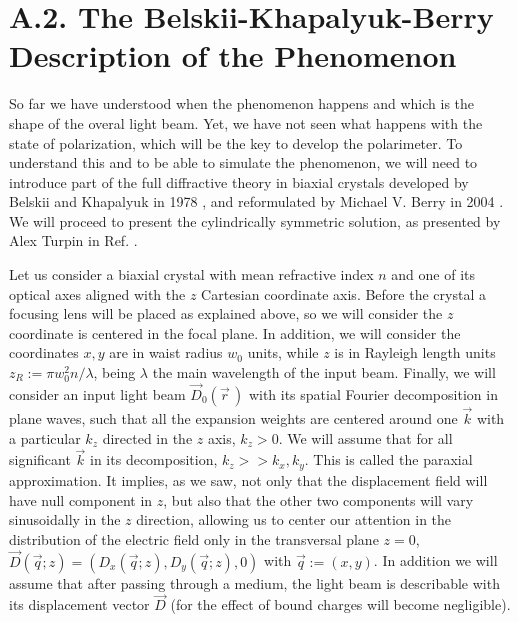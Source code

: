 \documentclass[11pt, a4paper, twoside]{article} %
\begin{document}
\section*{A.2. The Belskii-Khapalyuk-Berry Description of the Phenomenon }

So far we have understood when the phenomenon happens and which is the shape of the overal light beam. Yet, we have not seen what happens with the state of polarization, which will be the key to develop the polarimeter. To understand this and to be able to simulate the phenomenon, we will need to introduce part of the full diffractive theory in biaxial crystals developed by Belskii and Khapalyuk in 1978 \cite{BK1,BK2}, and reformulated by Michael V. Berry in 2004 \cite{Berry}. We will proceed to present the cylindrically symmetric solution, as presented by Alex Turpin in Ref. \cite{Turpin}.\vspace{-0.1cm}

Let us consider a biaxial crystal with mean refractive index $n$ and one of its optical axes aligned with the $z$ Cartesian coordinate axis. Before the crystal a focusing lens will be placed as explained above, so we will consider the $z$ coordinate is centered in the focal plane. In addition, we will consider the coordinates $x,y$ are in waist radius $w_0$ units, while $z$ is in Rayleigh length units $z_R:=\pi w_0^2n/\lambda$, being $\lambda$ the main wavelength of the input beam. Finally, we will consider an input light beam $\vec{D}_0(\vec{r}\,)$ with its spatial Fourier decomposition in plane waves, such that all the expansion weights are centered around one $\vec{k}$ with a particular $k_z$ directed in the $z$ axis, $k_z>0$. We will assume that for all significant $\vec{k}$ in its decomposition, $k_z>>k_x,k_y$. This is called the paraxial approximation. It implies, as we saw, not only that the displacement field will have null component in $z$, but also that the other two components will vary sinusoidally in the $z$ direction, allowing us to center our attention in the distribution of the electric field only in the transversal plane $z=0$, $\vec{D}(\vec{q};z)=(D_x(\vec{q};z),D_y(\vec{q};z), 0)$ with $\vec{q}:=(x,y)$. In addition we will assume that after passing through a medium, the light beam is describable with its displacement vector $\vec{D}$ (for the effect of bound charges will become negligible).
\end{document}
